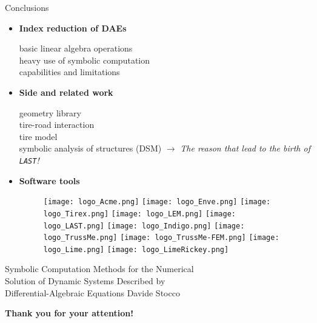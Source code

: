 \begin{frame}{Conclusions}
  \begin{itemize}
    \item \textbf{Index reduction of \acsp{DAE}} \\
    \begin{small}
      \qquad basic linear algebra operations \\
      \qquad heavy use of symbolic computation \\
      \qquad capabilities and limitations
    \end{small}
    \item \textbf{Side and related work} \\
    \begin{small}
      \qquad geometry library \\
      \qquad tire-road interaction \\
      \qquad tire model \\
      \qquad symbolic analysis of structures (\acs{DSM}) $\rightarrow$ \emph{The reason that lead to the birth of \texttt{LAST}!}
    \end{small}
    \item \textbf{Software tools} \\[0.2em]
    \begin{figure}
      \centering
      \texttt{[image: logo\_Acme.png]}%
      \texttt{[image: logo\_Enve.png]}%
      \texttt{[image: logo\_Tirex.png]}%
      \texttt{[image: logo\_LEM.png]}%
      \texttt{[image: logo\_LAST.png]}%
      \texttt{[image: logo\_Indigo.png]}%
      \texttt{[image: logo\_TrussMe.png]}%
      \texttt{[image: logo\_TrussMe-FEM.png]}%
      \texttt{[image: logo\_Lime.png]}%
      \texttt{[image: logo\_LimeRickey.png]}
    \end{figure}
  \end{itemize}
\end{frame}

\begin{frame}{%
  Symbolic Computation Methods for the Numerical \\
  Solution of Dynamic Systems Described by \\
  Differential-Algebraic Equations
  }{Davide Stocco}
  \vfill
  \raggedright{\selectfont\Huge\color{tx_sl_color}\bfseries{Thank you for your attention!}} \\[0.5em]
\end{frame}

